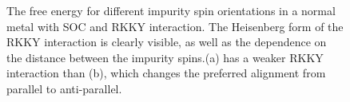 \begin{figure}[H]
    \centering
     \caption{The free energy for different impurity spin orientations in a normal metal with SOC and RKKY interaction. The Heisenberg form of the RKKY interaction is clearly visible, as well as the dependence on the distance between the impurity spins.(a) has a weaker RKKY interaction than (b), which changes the preferred alignment from parallel to anti-parallel.}
    \label{fig:spinstruct_nm+SOC}
\end{figure}
